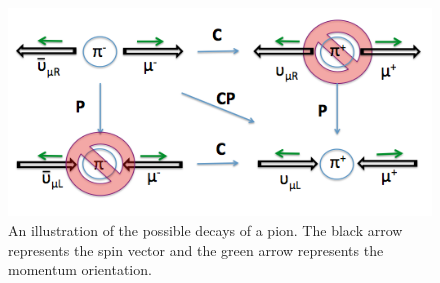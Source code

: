 \documentclass{outhesis}
\begin{document}
\begin{figure}
  \centering
  \includegraphics[scale=0.5]{figures/pion_cp}
  \caption{An illustration of the possible decays of a pion. The black arrow represents the spin vector and the green arrow represents the momentum orientation.}
  \label{fig:cp}
\end{figure}

\end{document}
